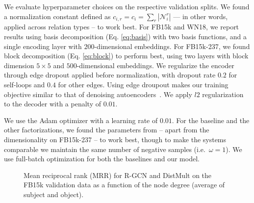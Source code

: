 We evaluate hyperparameter choices on the respective validation splits. We found a normalization constant defined as $c_{i,r}=c_{i}=\sum_{r} |\mathcal{N}^r_i|$ --- in other words, applied across relation types -- to work best. For FB15k and WN18, we report results using basis decomposition (Eq. \ref{eq:basis}) with two basis functions, and a single encoding layer with $200$-dimensional embeddings. For FB15k-237, we found block decomposition (Eq. \ref{eq:block}) to perform best, using two layers with block dimension $5 \times 5$ and $500$-dimensional embeddings. We regularize the encoder through edge dropout applied before normalization, with dropout rate $0.2$ for self-loops and $0.4$ for other edges. Using edge droupout makes our training objective similar to that of denoising autoencoders~\cite{vincent2008}. We apply $l2$ regularization to the decoder with a penalty of $0.01$.

We use the Adam optimizer \cite{kingma2014adam} with a learning rate of $0.01$. For the baseline and the other factorizations, we found the parameters from \citet{complex-complex_embeddings_for_simple_link_prediction} -- apart from the dimensionality on FB15k-237 -- to work best, though to make the systems comparable we maintain the same number of negative samples (i.e.~$\omega=1$). We use full-batch optimization for both the baselines and our model.

\begin{figure}
\centering
{}\vspace{-0.5em}
\caption{Mean reciprocal rank (MRR) for R-GCN  and DistMult on the FB15k validation data as a function of the node degree (average of subject and object).\label{figure:degree}}
\end{figure}

